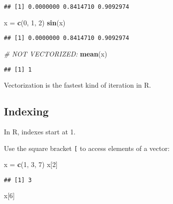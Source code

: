 \documentclass[
]{article}
\newenvironment{Shaded}{\begin{snugshade}}{\end{snugshade}}
\newcommand{\CommentTok}[1]{\textcolor[rgb]{0.56,0.35,0.01}{\textit{#1}}}
\newcommand{\DecValTok}[1]{\textcolor[rgb]{0.00,0.00,0.81}{#1}}
\newcommand{\KeywordTok}[1]{\textcolor[rgb]{0.13,0.29,0.53}{\textbf{#1}}}
\newcommand{\NormalTok}[1]{#1}
\newcommand{\StringTok}[1]{\textcolor[rgb]{0.31,0.60,0.02}{#1}}
\begin{document}
\begin{verbatim}
## [1] 0.0000000 0.8414710 0.9092974
\end{verbatim}

\begin{Shaded}
\begin{Highlighting}[]
\NormalTok{x =}\StringTok{ }\KeywordTok{c}\NormalTok{(}\DecValTok{0}\NormalTok{, }\DecValTok{1}\NormalTok{, }\DecValTok{2}\NormalTok{)}
\KeywordTok{sin}\NormalTok{(x)}
\end{Highlighting}
\end{Shaded}

\begin{verbatim}
## [1] 0.0000000 0.8414710 0.9092974
\end{verbatim}

\begin{Shaded}
\begin{Highlighting}[]
\CommentTok{\# NOT VECTORIZED:}
\KeywordTok{mean}\NormalTok{(x)}
\end{Highlighting}
\end{Shaded}

\begin{verbatim}
## [1] 1
\end{verbatim}

Vectorization is the fastest kind of iteration in R.

\hypertarget{indexing}{%
\subsection{Indexing}\label{indexing}}

In R, indexes start at 1.

Use the square bracket \texttt{{[}} to access elements of a vector:

\begin{Shaded}
\begin{Highlighting}[]
\NormalTok{x =}\StringTok{ }\KeywordTok{c}\NormalTok{(}\DecValTok{1}\NormalTok{, }\DecValTok{3}\NormalTok{, }\DecValTok{7}\NormalTok{)}
\NormalTok{x[}\DecValTok{2}\NormalTok{]}
\end{Highlighting}
\end{Shaded}

\begin{verbatim}
## [1] 3
\end{verbatim}

\begin{Shaded}
\begin{Highlighting}[]
\NormalTok{x[}\DecValTok{6}\NormalTok{]}
\end{Highlighting}
\end{Shaded}
\end{document}
